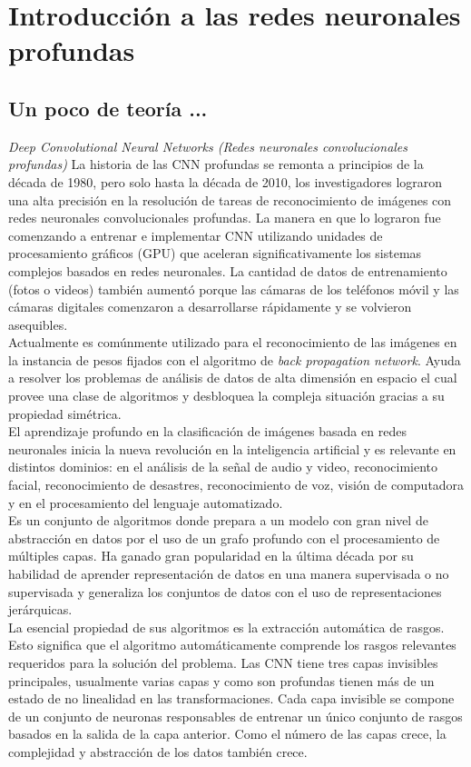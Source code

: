 \documentclass{book}
\begin{document}
	\chapter{Introducci\'on a las redes neuronales profundas}
		\section{Un poco de teor\'ia ...}
			\textit{Deep Convolutional Neural Networks (Redes neuronales convolucionales profundas)} 
			La historia de las CNN profundas se remonta a principios de la d\'ecada de 1980, pero solo hasta la d\'ecada de 2010, los investigadores lograron una alta precisi\'on en la resoluci\'on de tareas de reconocimiento de im\'agenes con redes neuronales convolucionales profundas. La manera en que lo lograron fue comenzando a entrenar e implementar CNN utilizando unidades de procesamiento gr\'aficos (GPU) que aceleran significativamente los sistemas complejos basados en redes neuronales. La cantidad de datos de entrenamiento (fotos o videos) tambi\'en aument\'o porque las c\'amaras de los tel\'efonos m\'ovil y las c\'amaras digitales comenzaron a desarrollarse r\'apidamente y se volvieron asequibles. \\
			
			Actualmente es com\'unmente utilizado para el reconocimiento de las im\'agenes en la instancia de pesos fijados con el algoritmo de \textit{back propagation network}. Ayuda a resolver los problemas de an\'alisis de datos de alta dimensi\'on en espacio el cual provee una clase de algoritmos y desbloquea la compleja situaci\'on gracias a su propiedad sim\'etrica. \\
			El aprendizaje profundo en la clasificaci\'on de im\'agenes basada en redes neuronales inicia la nueva revoluci\'on en la inteligencia artificial y es relevante en distintos dominios: en el an\'alisis de la se\~nal de audio y video, reconocimiento facial, reconocimiento de desastres, reconocimiento de voz, visi\'on de computadora y en el procesamiento del lenguaje automatizado. \\
			Es un conjunto de algoritmos donde prepara a un modelo con gran nivel de abstracci\'on en datos por el uso de un grafo profundo con el procesamiento de m\'ultiples	capas. Ha ganado gran popularidad en la \'ultima d\'ecada por su habilidad de aprender representaci\'on de datos en una manera supervisada o no supervisada y generaliza los conjuntos de datos con el uso de representaciones jer\'arquicas. \\
			La esencial propiedad de sus algoritmos es la extracci\'on autom\'atica de rasgos. Esto significa que el algoritmo autom\'aticamente comprende los rasgos relevantes requeridos para la soluci\'on del problema. Las CNN tiene tres capas invisibles principales, usualmente varias capas y como son profundas tienen m\'as de un estado de no linealidad en las transformaciones. Cada capa invisible se compone de un conjunto de neuronas responsables de entrenar un \'unico conjunto de rasgos basados en la salida de la capa anterior. Como el n\'umero de las capas crece, la complejidad y abstracci\'on de los datos tambi\'en crece.
\end{document}
